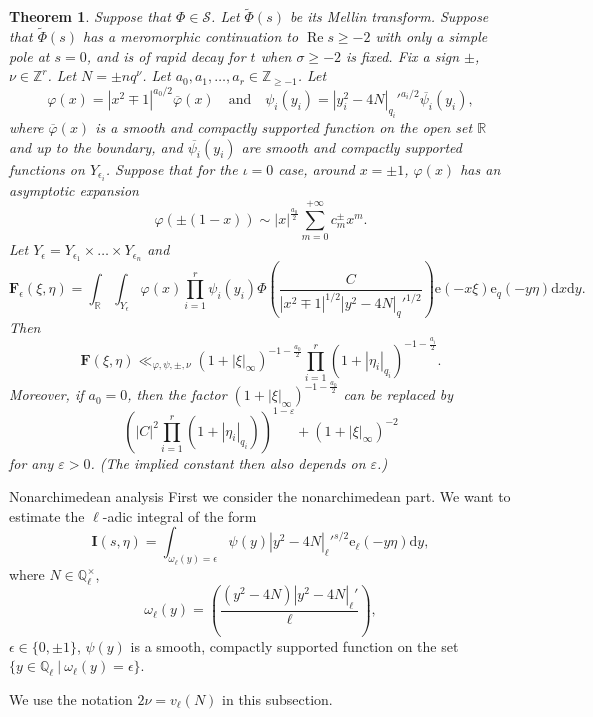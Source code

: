 \documentclass[10pt,oneside,reqno]{amsart}
\makeatletter
\newcommand\rmd{\mathrm{d}}
\newcommand\rme{\mathrm{e}}
\newcommand\cS{\mathcal{S}}
\newcommand\bF{\mathbf{F}}
\newcommand\bI{\mathbf{I}}
\newcommand\QQ{\mathbb{Q}}
\newcommand\RR{\mathbb{R}}
\newcommand\ZZ{\mathbb{Z}}
\renewcommand\Re{\mathop{\mathrm{Re}}}
\renewcommand\geq{\geqslant}
\newcommand\legendresymbol[2]{\genfrac{(}{)}{}{}{#1}{#2}}
\def\subsection{\@startsection{subsection}{2}
  \z@{3pt\@plus0pt}{-.5em}%
  {\normalfont\bfseries}}
\theoremstyle{THEOREM}
\newtheorem{theorem}{Theorem}[section]
\theoremstyle{DEFINITION}
\theoremstyle{EXERCISE}
\numberwithin{equation}{section}
\makeatother
\begin{document}
\begin{theorem}\label{thm:mainfourierestimate2}
Suppose that $\Phi\in \cS$. Let $\widetilde{\Phi}(s)$ be its Mellin transform. Suppose that $\widetilde{\Phi}(s)$ has a meromorphic continuation to $\Re s\geq -2$ with only a simple pole at $s=0$, and is of rapid decay for $t$ when $\sigma\geq -2$ is fixed. Fix a sign $\pm$, $\nu\in \ZZ^r$. Let $N=\pm nq^\nu$. Let $a_0,a_1,\dots,a_r\in \ZZ_{\geq -1}$. Let 
\[
\varphi(x)=|x^2\mp 1|^{a_0/2} \overline{\varphi}(x)\quad\text{and}\quad \psi_i(y_i)=|y_i^2-4N|_{q_i}'^{a_i/2} \overline{\psi_i}(y_i),
\]
where $\overline{\varphi}(x)$ is a smooth and compactly supported function on the open set $\RR$ and up to the boundary, and $\overline{\psi_i}(y_i)$ are smooth and compactly supported functions on $Y_{\epsilon_i}$. Suppose that for the $\iota=0$ case, around $x=\pm 1$, $\varphi(x)$ has an asymptotic expansion
\[
\varphi(\pm(1-x))\sim |x|^{\frac{a_0}{2}}\sum_{m=0}^{+\infty}c_m^\pm x^m.
\]
Let $Y_\epsilon=Y_{\epsilon_1}\times\dots\times Y_{\epsilon_n}$ and 
\[
\bF_\epsilon(\xi,\eta)=\int_{\RR}\int_{Y_\epsilon}\varphi(x)\prod_{i=1}^{r}\psi_i(y_i)\Phi\legendresymbol{C}{|x^2\mp 1|^{1/2}|y^2-4N|_q'^{1/2}}\rme(-x\xi)\rme_{q}(-y\eta)\rmd x\rmd y.
\]
Then
\[
\bF(\xi,\eta)\ll_{\varphi,\psi,\pm,\nu} (1+|\xi|_\infty)^{-1-\frac{a_0}{2}}\prod_{i=1}^{r}(1+|\eta_i|_{q_i})^{-1-\frac{a_i}{2}}.
\]
Moreover, if $a_0=0$, then the factor $(1+|\xi|_\infty)^{-1-\frac{a_0}{2}}$ can be replaced by 
\[
\left(|C|^2\prod_{i=1}^{r}(1+|\eta_i|_{q_i})\right)^{1-\varepsilon}+(1+|\xi|_\infty)^{-2}
\]
for any $\varepsilon>0$. (The implied constant then also depends on $\varepsilon$.)
\end{theorem}

\subsection{Nonarchimedean analysis}
First we consider the nonarchimedean part.
We want to estimate the $\ell$-adic integral of the form
\begin{equation}\label{eq:ladicfourier}
\bI(s,\eta)=\int_{\omega_\ell(y)=\epsilon}\psi(y)|y^2-4N|_\ell'^{s/2} \rme_\ell(-y\eta)\rmd y,
\end{equation}
where $N\in \QQ_\ell^\times$,
\[
\omega_\ell(y)=\legendresymbol{(y^2-4N)|y^2-4N|_\ell'}{\ell},
\]
$\epsilon\in \{0,\pm 1\}$, $\psi(y)$ is a smooth, compactly supported function on the set $\{y\in \QQ_\ell\ |\ \omega_\ell(y)=\epsilon\}$. 

We use the notation $2\nu=v_\ell(N)$ in this subsection.
\end{document}
